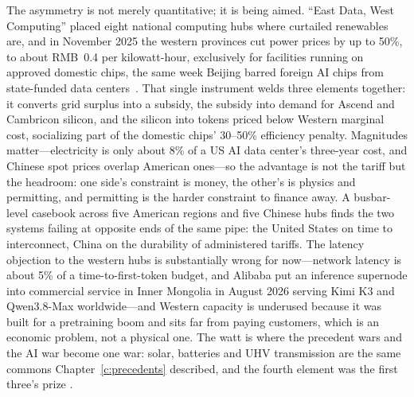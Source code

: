 

The asymmetry is not merely quantitative; it is being aimed. ``East Data, West Computing'' placed eight national computing hubs where curtailed renewables are, and in November 2025 the western provinces cut power prices by up to 50\%, to about RMB~0.4 per kilowatt-hour, exclusively for facilities running on approved domestic chips, the same week Beijing barred foreign AI chips from state-funded data centers~\cite{china-dc-power,datacenter-mandate}. That single instrument welds three elements together: it converts grid surplus into a subsidy, the subsidy into demand for Ascend and Cambricon silicon, and the silicon into tokens priced below Western marginal cost, socializing part of the domestic chips' 30--50\% efficiency penalty. Magnitudes matter---electricity is only about 8\% of a US AI data center's three-year cost, and Chinese spot prices overlap American ones---so the advantage is not the tariff but the headroom: one side's constraint is money, the other's is physics and permitting, and permitting is the harder constraint to finance away. A busbar-level casebook across five American regions and five Chinese hubs finds the two systems failing at opposite ends of the same pipe: the United States on time to interconnect, China on the durability of administered tariffs. The latency objection to the western hubs is substantially wrong for now---network latency is about 5\% of a time-to-first-token budget, and Alibaba put an inference supernode into commercial service in Inner Mongolia in August 2026 serving Kimi K3 and Qwen3.8-Max worldwide---and Western capacity is underused because it was built for a pretraining boom and sits far from paying customers, which is an economic problem, not a physical one. The watt is where the precedent wars and the AI war become one war: solar, batteries and UHV transmission are the same commons Chapter~\ref{c:precedents} described, and the fourth element was the first three's prize .



